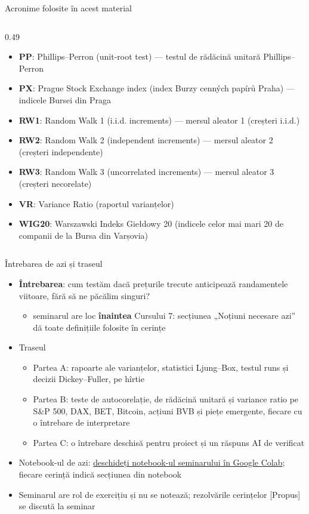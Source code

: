 \begin{frame}{Acronime folosite în acest material}
\begin{columns}[T]
\begin{column}{0.49\textwidth}
\begin{itemize}
    \item \textbf{PP}: Phillips–Perron (unit-root test) — testul de rădăcină unitară Phillips–Perron
    \item \textbf{PX}: Prague Stock Exchange index (index Burzy cenných papírů Praha) — indicele Bursei din Praga
    \item \textbf{RW1}: Random Walk 1 (i.i.d. increments) — mersul aleator 1 (creșteri i.i.d.)
    \item \textbf{RW2}: Random Walk 2 (independent increments) — mersul aleator 2 (creșteri independente)
    \item \textbf{RW3}: Random Walk 3 (uncorrelated increments) — mersul aleator 3 (creșteri necorelate)
    \item \textbf{VR}: Variance Ratio (raportul varianțelor)
    \item \textbf{WIG20}: Warszawski Indeks Giełdowy 20 (indicele celor mai mari 20 de companii de la Bursa din Varșovia)
\end{itemize}
\end{column}
\end{columns}
\end{frame}

\begin{frame}{Întrebarea de azi și traseul}
\itemsize{\small}
\begin{itemize}
    \item \textbf{Întrebarea}: cum testăm dacă prețurile trecute anticipează randamentele viitoare, fără să ne păcălim singuri?
    \begin{itemize}
        \item seminarul are loc \textbf{înaintea} Cursului 7: secțiunea „Noțiuni necesare azi” dă toate definițiile folosite în cerințe
    \end{itemize}
    \item Traseul
    \begin{itemize}
        \item Partea A: rapoarte ale varianțelor, statistici Ljung--Box, testul runs și decizii Dickey--Fuller, pe hîrtie
        \item Partea B: teste de autocorelație, de rădăcină unitară și variance ratio pe S\&P 500, DAX, BET, Bitcoin, acțiuni BVB și piețe emergente, fiecare cu o întrebare de interpretare
        \item Partea C: o întrebare deschisă pentru proiect și un răspuns AI de verificat
    \end{itemize}
    \item Notebook-ul de azi: \href{\nb}{deschideți notebook-ul seminarului în Google Colab}; fiecare cerință indică secțiunea din notebook
    \item Seminarul are rol de exercițiu și nu se notează; rezolvările cerințelor [Propus] se discută la seminar
\end{itemize}
\end{frame}

